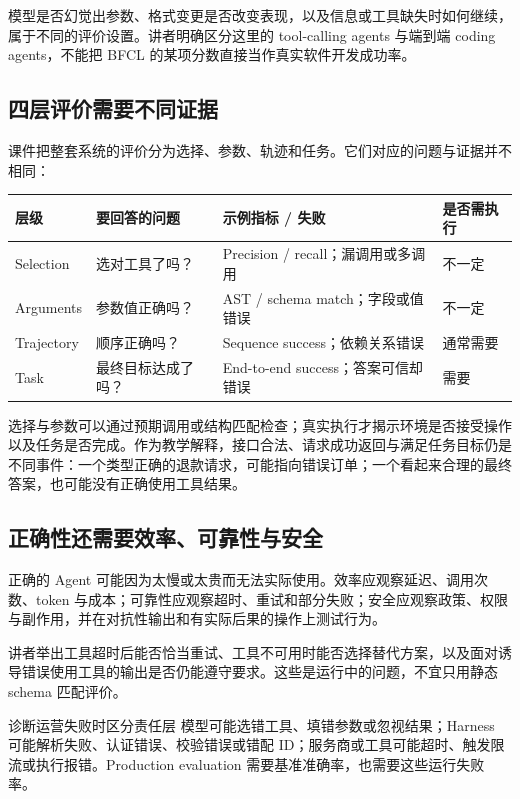 \documentclass[11pt,a4paper]{article}
\begin{document}
模型是否幻觉出参数、格式变更是否改变表现，以及信息或工具缺失时如何继续，属于不同的评价设置。讲者明确区分这里的 tool-calling agents 与端到端 coding agents，不能把 BFCL 的某项分数直接当作真实软件开发成功率。

\subsection{四层评价需要不同证据}
课件把整套系统的评价分为选择、参数、轨迹和任务。它们对应的问题与证据并不相同：
\begin{center}\small\renewcommand{\arraystretch}{1.25}
\begin{tabularx}{\textwidth}{L{2cm} L{2.7cm} X L{2cm}}
\toprule
层级 & 要回答的问题 & 示例指标 / 失败 & 是否需执行\\
\midrule
Selection & 选对工具了吗？ & Precision / recall；漏调用或多调用 & 不一定\\
Arguments & 参数值正确吗？ & AST / schema match；字段或值错误 & 不一定\\
Trajectory & 顺序正确吗？ & Sequence success；依赖关系错误 & 通常需要\\
Task & 最终目标达成了吗？ & End-to-end success；答案可信却错误 & 需要\\
\bottomrule
\end{tabularx}\end{center}

选择与参数可以通过预期调用或结构匹配检查；真实执行才揭示环境是否接受操作以及任务是否完成。作为教学解释，接口合法、请求成功返回与满足任务目标仍是不同事件：一个类型正确的退款请求，可能指向错误订单；一个看起来合理的最终答案，也可能没有正确使用工具结果。

\subsection{正确性还需要效率、可靠性与安全}
正确的 Agent 可能因为太慢或太贵而无法实际使用。效率应观察延迟、调用次数、token 与成本；可靠性应观察超时、重试和部分失败；安全应观察政策、权限与副作用，并在对抗性输出和有实际后果的操作上测试行为。

讲者举出工具超时后能否恰当重试、工具不可用时能否选择替代方案，以及面对诱导错误使用工具的输出是否仍能遵守要求。这些是运行中的问题，不宜只用静态 schema 匹配评价。

\begin{importantbox}{诊断运营失败时区分责任层}
模型可能选错工具、填错参数或忽视结果；Harness 可能解析失败、认证错误、校验错误或错配 ID；服务商或工具可能超时、触发限流或执行报错。Production evaluation 需要基准准确率，也需要这些运行失败率。
\end{importantbox}
\end{document}
